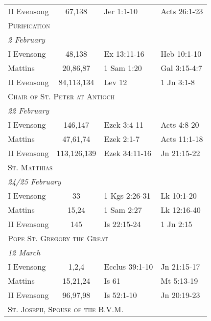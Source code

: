 \begin{longtable}{l c l l}
\hspace{1em} II Evensong&67,138&Jer 1:1-10&Acts 26:1-23\\
\multicolumn{4}{l}{\textsc{Purification}}\\
\multicolumn{4}{l}{\textit{2 February}}\\
\hspace{1em} I Evensong&48,138&Ex 13:11-16&Heb 10:1-10\\
\hspace{1em} Mattins&20,86,87&1 Sam 1:20&Gal 3:15-4:7\\
\hspace{1em} II Evensong&84,113,134&Lev 12&1 Jn 3:1-8\\
\multicolumn{4}{l}{\textsc{Chair of St. Peter at Antioch}}\\
\multicolumn{4}{l}{\textit{22 February}}\\
\hspace{1em} I Evensong&146,147&Ezek 3:4-11&Acts 4:8-20\\
\hspace{1em} Mattins&47,61,74&Ezek 2:1-7&Acts 11:1-18\\
\hspace{1em} II Evensong&113,126,139&Ezek 34:11-16&Jn 21:15-22\\
\multicolumn{4}{l}{\textsc{St. Matthias}}\\
\multicolumn{4}{l}{\textit{24/25 February}}\\
\hspace{1em} I Evensong&33&1 Kgs 2:26-31&Lk 10:1-20\\
\hspace{1em} Mattins&15,24&1 Sam 2:27&Lk 12:16-40\\
\hspace{1em} II Evensong&145&Is 22:15-24&1 Jn 2:15\\
%
\multicolumn{4}{l}{\textsc{Pope St. Gregory the Great}}\\
\multicolumn{4}{l}{\textit{12 March}}\\
\hspace{1em} I Evensong&1,2,4&Ecclus 39:1-10&Jn 21:15-17\\
\hspace{1em} Mattins&15,21,24&Is 61&Mt 5:13-19\\
\hspace{1em} II Evensong&96,97,98&Is 52:1-10&Jn 20:19-23\\
\multicolumn{4}{l}{\textsc{St. Joseph, Spouse of the B.V.M.}}\\

\end{longtable}
